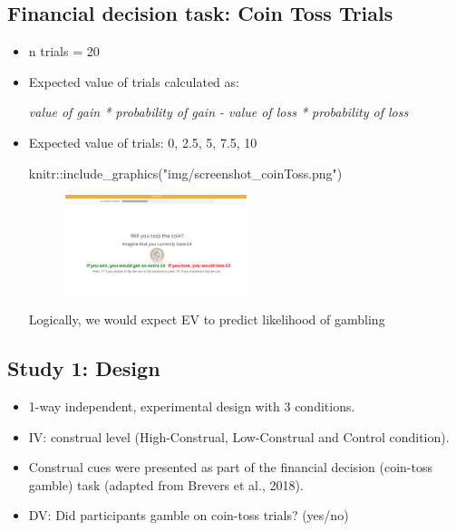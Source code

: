 \documentclass[
  letterpaper,
  DIV=11,
  numbers=noendperiod]{scrartcl}
\newenvironment{Shaded}{\begin{snugshade}}{\end{snugshade}}
\newcommand{\FunctionTok}[1]{\textcolor[rgb]{0.28,0.35,0.67}{#1}}
\newcommand{\NormalTok}[1]{\textcolor[rgb]{0.00,0.23,0.31}{#1}}
\newcommand{\SpecialCharTok}[1]{\textcolor[rgb]{0.37,0.37,0.37}{#1}}
\newcommand{\StringTok}[1]{\textcolor[rgb]{0.13,0.47,0.30}{#1}}
\begin{document}
\hypertarget{financial-decision-task-coin-toss-trials}{%
\subsection{Financial decision task: Coin Toss
Trials}\label{financial-decision-task-coin-toss-trials}}

\begin{itemize}
\item
  n trials = 20
\item
  Expected value of trials calculated as:

  \emph{value of gain * probability of gain - value of loss *
  probability of loss}
\item
  Expected value of trials: 0, 2.5, 5, 7.5, 10

\begin{Shaded}
\begin{Highlighting}[]
\NormalTok{knitr}\SpecialCharTok{::}\FunctionTok{include\_graphics}\NormalTok{(}\StringTok{"img/screenshot\_coinToss.png"}\NormalTok{)}
\end{Highlighting}
\end{Shaded}

  \begin{figure}[H]

  {\centering \includegraphics[width=0.5\textwidth,height=\textheight]{img/screenshot_coinToss.png}

  }

  \end{figure}

  Logically, we would expect EV to predict likelihood of gambling
\end{itemize}

\hypertarget{study-1-design}{%
\subsection{Study 1: Design}\label{study-1-design}}

\begin{itemize}
\item
  1-way independent, experimental design with 3 conditions.
\item
  IV: construal level (High-Construal, Low-Construal and Control
  condition).
\item
  Construal cues were presented as part of the financial decision
  (coin-toss gamble) task (adapted from Brevers et al., 2018).
\item
  DV: Did participants gamble on coin-toss trials? (yes/no)
\end{itemize}
\end{document}
